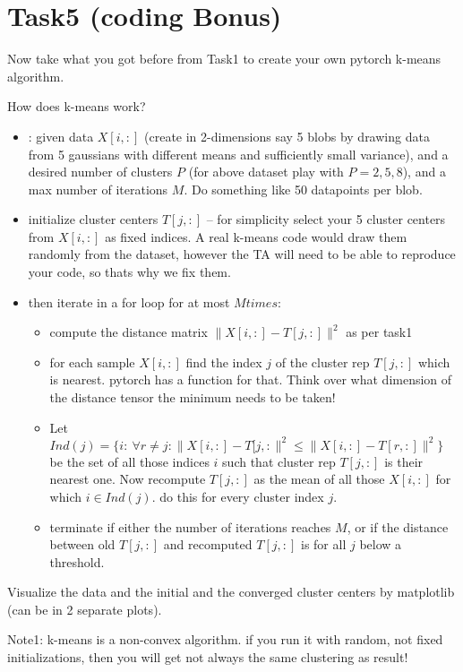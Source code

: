 \documentclass{article}
\newcommand{\bi}[1]{\begin{itemize}#1\end{itemize}}
\newcommand{\s}{ \\\vspace{3mm} }
\begin{document}
\section{Task5 (coding Bonus)}

Now take what you got before from Task1 to create your own pytorch k-means algorithm.

How does k-means work?

\bi{
\item: given data $X[i,:]$ (create in 2-dimensions say 5 blobs by drawing data from 5 gaussians with different means and sufficiently small variance), and a desired number of clusters $P$ (for above dataset play with $P=2,5,8$), and a max number of iterations $M$. Do something like 50 datapoints per blob.

\item initialize cluster centers $T[j,:]$ -- for simplicity select your 5 cluster centers from $X[i,:]$ as fixed indices. A real k-means code would draw them randomly from the dataset, however the TA will need to be able to reproduce your code, so thats why we fix them.

\item then iterate in a for loop for at most $M times$:
\bi{
\item compute the distance matrix $\|X[i,:]-T[j,:] \|^2$ as per task1
\item for each sample $X[i,:]$ find the index $j$ of the cluster rep $T[j,:]$ which is nearest. pytorch has a function for that. Think over what dimension of the distance tensor the minimum needs to be taken!

\item Let $Ind(j) = \{  i: \ \forall r \neq j: \|X[i,:]-T[j,: \|^2 \le \|X[i,:]-T[r,:] \|^2    \}$ 
be the set of all those indices $i$ such that cluster rep $T[j,:]$ is their nearest one. Now recompute $T[j,:]$ as the mean of all those $X[i,:]$ for which $i \in Ind(j)$. do this for every cluster index $j$.
\item terminate if either the number of iterations reaches $M$, or if the distance between old $T[j,:]$ and recomputed $T[j,:]$ is for all $j$ below a threshold.
}
}


Visualize the data and the initial and the converged cluster centers by matplotlib (can be in 2 separate plots).\s


Note1: k-means is a non-convex algorithm. if you run it with random, not fixed initializations, then you will get not always the same clustering as result!\s

\end{document}
